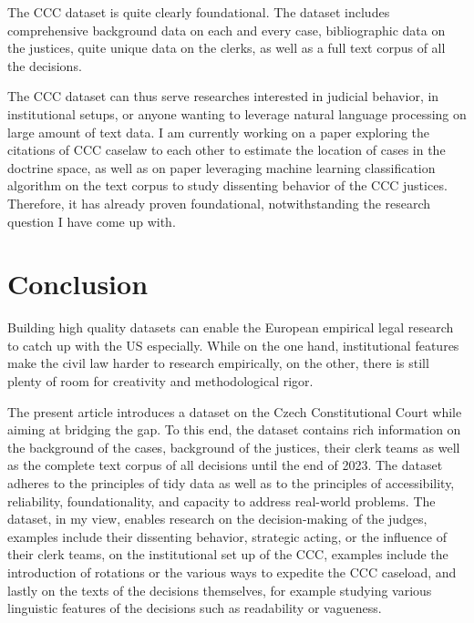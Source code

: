 \documentclass[
  11pt,
]{article}
\begin{document}
The CCC dataset is quite clearly foundational. The dataset includes
comprehensive background data on each and every case, bibliographic data
on the justices, quite unique data on the clerks, as well as a full text
corpus of all the decisions.

The CCC dataset can thus serve researches interested in judicial
behavior, in institutional setups, or anyone wanting to leverage natural
language processing on large amount of text data. I am currently working
on a paper exploring the citations of CCC caselaw to each other to
estimate the location of cases in the doctrine space, as well as on
paper leveraging machine learning classification algorithm on the text
corpus to study dissenting behavior of the CCC justices. Therefore, it
has already proven foundational, notwithstanding the research question I
have come up with.

\hypertarget{conclusion}{%
\section{Conclusion}\label{conclusion}}

Building high quality datasets can enable the European empirical legal
research to catch up with the US especially. While on the one hand,
institutional features make the civil law harder to research
empirically, on the other, there is still plenty of room for creativity
and methodological rigor.

The present article introduces a dataset on the Czech Constitutional
Court while aiming at bridging the gap. To this end, the dataset
contains rich information on the background of the cases, background of
the justices, their clerk teams as well as the complete text corpus of
all decisions until the end of 2023. The dataset adheres to the
principles of tidy data as well as to the principles of accessibility,
reliability, foundationality, and capacity to address real-world
problems. The dataset, in my view, enables research on the
decision-making of the judges, examples include their dissenting
behavior, strategic acting, or the influence of their clerk teams, on
the institutional set up of the CCC, examples include the introduction
of rotations or the various ways to expedite the CCC caseload, and
lastly on the texts of the decisions themselves, for example studying
various linguistic features of the decisions such as readability or
vagueness.

\vspace{30pt}
\end{document}
